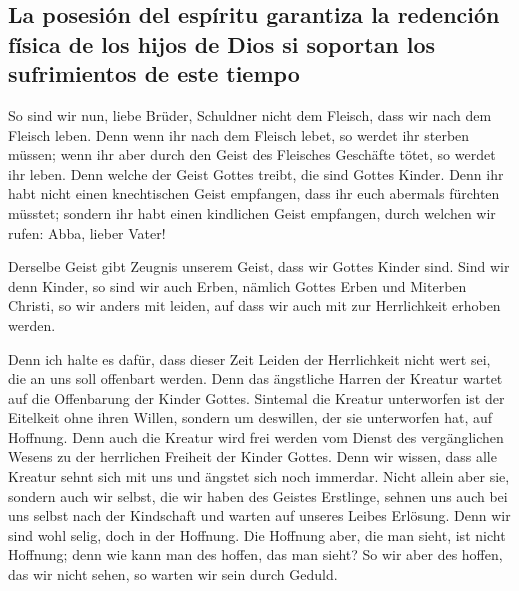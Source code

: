 \hypertarget{la-posesiuxf3n-del-espuxedritu-garantiza-la-redenciuxf3n-fuxedsica-de-los-hijos-de-dios-si-soportan-los-sufrimientos-de-este-tiempo}{%
\subsection{La posesión del espíritu garantiza la redención física de
los hijos de Dios si soportan los sufrimientos de este
tiempo}\label{la-posesiuxf3n-del-espuxedritu-garantiza-la-redenciuxf3n-fuxedsica-de-los-hijos-de-dios-si-soportan-los-sufrimientos-de-este-tiempo}}

 So sind wir nun, liebe Brüder, Schuldner nicht dem
Fleisch, dass wir nach dem Fleisch leben.  Denn wenn ihr
nach dem Fleisch lebet, so werdet ihr sterben müssen; wenn ihr aber
durch den Geist des Fleisches Geschäfte tötet, so werdet ihr leben.
 Denn welche der Geist Gottes treibt, die sind Gottes
Kinder.  Denn ihr habt nicht einen knechtischen Geist
empfangen, dass ihr euch abermals fürchten müsstet; sondern ihr habt
einen kindlichen Geist empfangen, durch welchen wir rufen: Abba, lieber
Vater!

 Derselbe Geist gibt Zeugnis unserem Geist, dass wir
Gottes Kinder sind.  Sind wir denn Kinder, so sind wir
auch Erben, nämlich Gottes Erben und Miterben Christi, so wir anders mit
leiden, auf dass wir auch mit zur Herrlichkeit erhoben werden.

 Denn ich halte es dafür, dass dieser Zeit Leiden der
Herrlichkeit nicht wert sei, die an uns soll offenbart werden.
 Denn das ängstliche Harren der Kreatur wartet auf die
Offenbarung der Kinder Gottes.  Sintemal die Kreatur
unterworfen ist der Eitelkeit ohne ihren Willen, sondern um deswillen,
der sie unterworfen hat, auf Hoffnung.  Denn auch die
Kreatur wird frei werden vom Dienst des vergänglichen Wesens zu der
herrlichen Freiheit der Kinder Gottes.  Denn wir wissen,
dass alle Kreatur sehnt sich mit uns und ängstet sich noch immerdar.
 Nicht allein aber sie, sondern auch wir selbst, die wir
haben des Geistes Erstlinge, sehnen uns auch bei uns selbst nach der
Kindschaft und warten auf unseres Leibes Erlösung.  Denn
wir sind wohl selig, doch in der Hoffnung. Die Hoffnung aber, die man
sieht, ist nicht Hoffnung; denn wie kann man des hoffen, das man sieht?
 So wir aber des hoffen, das wir nicht sehen, so warten
wir sein durch Geduld.

